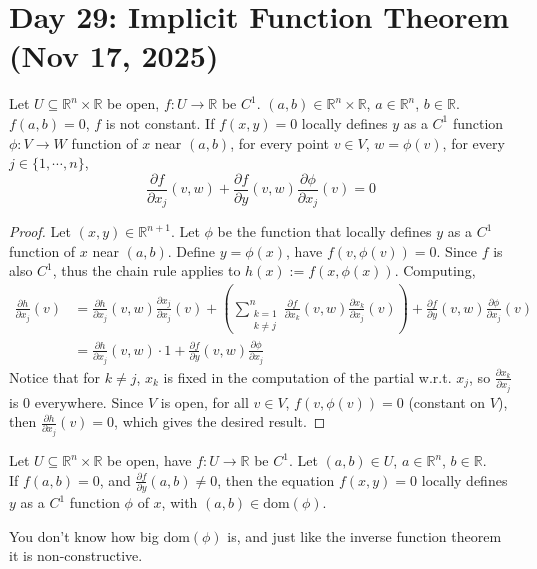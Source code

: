 \section{Day 29: Implicit Function Theorem (Nov 17, 2025)}

\begin{simplethm}
Let $U \subseteq \mathbb{R}^n \times \mathbb{R}$ be open, $f : U \to \mathbb{R}$ be $C^1$. $(a, b) \in \mathbb{R}^n \times \mathbb{R}$, $a \in \mathbb{R}^n$, $b \in \mathbb{R}$. $f(a, b) = 0$, $f$ is not constant. If $f(x, y) = 0$ locally defines $y$ as a $C^1$ function $\phi: V \to W$ function of $x$ near $(a, b)$, for every point $v \in V$, $w = \phi(v)$, for every $j \in \{ 1, \cdots, n \}$,
    \[
    \frac{\partial f}{\partial x_j}(v, w) + \frac{\partial f}{\partial y}(v, w) \frac{\partial \phi}{\partial x_j}(v) = 0
    \]
\end{simplethm}

\begin{proof}
    Let $(x, y) \in \mathbb{R}^{n + 1}$. Let $\phi$ be the function that locally defines $y$ as a $C^1$ function of $x$ near $(a, b)$. Define $y = \phi(x)$, have $f(v, \phi(v)) = 0$. Since $f$ is also $C^1$, thus the chain rule applies to $h(x) := f(x, \phi(x))$. Computing,
   \begin{align*}
       \frac{\partial h}{\partial x_j}(v) &= \frac{\partial h}{\partial x_j}(v, w) \frac{\partial x_j}{\partial x_j}(v) +
       \left(\sum_{\substack{k = 1 \\ k \ne j}}^{n} \frac{\partial f}{\partial x_k}(v, w) \frac{\partial x_k}{\partial x_j}(v) \right) +
       \frac{\partial f}{\partial y}(v, w) \frac{\partial \phi}{\partial x_j}(v) \\
        &= \frac{\partial h}{\partial x_j}(v, w) \cdot 1 + \frac{\partial f}{\partial y}(v, w) \frac{\partial \phi}{\partial x_j}
    \end{align*}
    Notice that for $k \ne j$, $x_k$ is fixed in the computation of the partial w.r.t. $x_j$, so $\frac{\partial x_k}{\partial x_j}$ is 0 everywhere. Since $V$ is open, for all $v \in V$, $f(v, \phi(v)) = 0$ (constant on $V$), then $\frac{\partial h}{\partial x_j}(v) = 0$, which gives the desired result.
\end{proof}

\begin{theorem}
    Let $U \subseteq \mathbb{R}^n \times \mathbb{R}$ be open, have $f : U \to \mathbb{R}$ be $C^1$. Let $(a, b) \in U$, $a \in \mathbb{R}^n$, $b \in \mathbb{R}$. \\
    If $f(a, b) = 0$, and $\frac{\partial f}{\partial y}(a, b) \ne 0$, then the equation $f(x, y) = 0$ locally defines $y$ as a $C^1$ function $\phi$ of $x$, with $(a, b) \in \text{dom}(\phi)$.
\end{theorem}

\noindent You don't know how big $\text{dom}(\phi)$ is, and just like the inverse function theorem it is non-constructive. 



